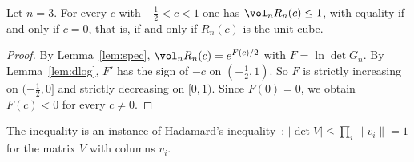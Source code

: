 \begin{theorem}\label{thm:main}
Let $n=3$. For every $c$ with $- \frac{1}{2}<c<1$ one has $\vol_nR_n(c)\le1$, with equality if and only if $c=0$, that is, if and only if $R_n(c)$ is the unit cube.
\end{theorem}
\begin{proof}
By Lemma~\ref{lem:spec}, $\vol_nR_n(c)=e^{F(c)/2}$ with $F=\ln\det G_n$.
By Lemma~\ref{lem:dlog}, $F'$ has the sign of $-c$ on $(- \frac{1}{2},1)$.
So $F$ is strictly increasing on $(- \frac{1}{2},0]$ and strictly decreasing on $[0,1)$.
Since $F(0)=0$, we obtain $F(c)<0$ for every $c\ne0$.
\end{proof}
\begin{remark}
The inequality is an instance of Hadamard's inequality~\cite{hadamard}: $|\det V|\le\prod_i\|v_i\|=1$ for the matrix $V$ with columns $v_i$.
\end{remark}
